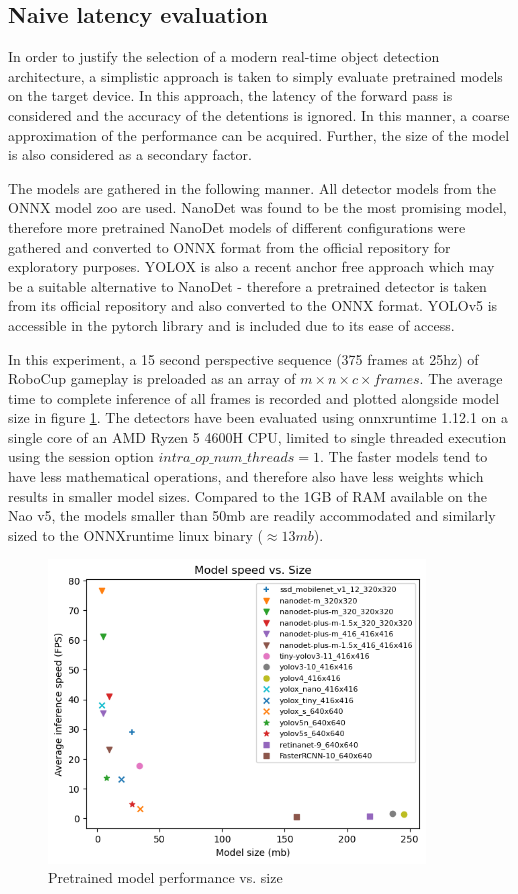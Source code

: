\documentclass[a4paper,twoside,12pt]{report}
\begin{document}
\subsection{Naive latency evaluation}
In order to justify the selection of a modern real-time object detection architecture, a simplistic approach is taken to simply evaluate pretrained models on the target device. In this approach, the latency of the forward pass is considered and the accuracy of the detentions is ignored. In this manner, a coarse approximation of the performance can be acquired. Further, the size of the model is also considered as a secondary factor.

The models are gathered in the following manner. All detector models from the ONNX model zoo \cite{modelzoo} are used. NanoDet was found to be the most promising model, therefore more pretrained NanoDet models of different configurations were gathered and converted to ONNX format from the official repository for exploratory purposes. YOLOX \citep{yolox} is also a recent anchor free approach which may be a suitable alternative to NanoDet - therefore a pretrained detector is taken from its official repository \citep{yoloxrepo} and also converted to the ONNX format. YOLOv5 is accessible in the pytorch library and is included due to its ease of access. 

In this experiment, a 15 second perspective sequence (375 frames at 25hz) of RoboCup gameplay is preloaded as an array of $m \times n \times c \times frames$. The average time to complete inference of all frames is recorded and plotted alongside model size in figure \ref{fig:modelspeedsize}. The detectors have been evaluated using onnxruntime 1.12.1 on a single core of an AMD Ryzen 5 4600H CPU, limited to single threaded execution using the session option $intra\_op\_num\_threads = 1$. The faster models tend to have less mathematical operations, and therefore also have less weights which results in smaller model sizes. Compared to the 1GB of RAM available on the Nao v5, the models smaller than 50mb are readily accommodated and similarly sized to the ONNXruntime linux binary ($\approx13mb$).

\begin{figure}[h!]
\begin{center}
\includegraphics[width=10cm]{images/modelspeedsize.png}
\caption{Pretrained model performance vs. size}
\label{fig:modelspeedsize}
\end{center}
\end{figure}
\end{document}

